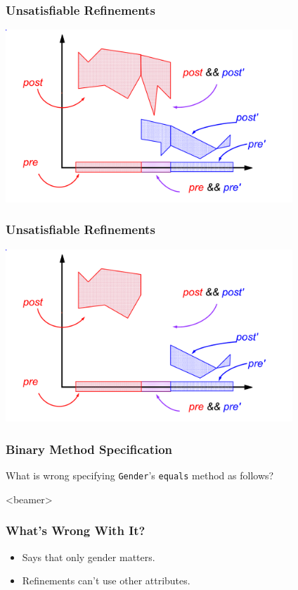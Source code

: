\begin{frame}
\frametitle{Unsatisfiable Refinements}
\includegraphics[width=4.25in]{unsatisfiable}
\end{frame}

\begin{frame}
\frametitle{Unsatisfiable Refinements}
\transdissolve[duration=0.5]
\includegraphics[width=4.25in]{unsatisfiable2}
\end{frame}

\begin{frame}[fragile]
\frametitle{Binary Method Specification}
\begin{question}
What is wrong specifying \lstinline!Gender!'s \lstinline!equals!
method as follows?

\rm

\end{question}
\end{frame}

\begin{frame}<beamer>
\frametitle{What's Wrong With It?}
\begin{itemize}
\item
Says that only gender matters.

\item
Refinements \alert{can't} use other attributes.
\end{itemize}
\end{frame}

